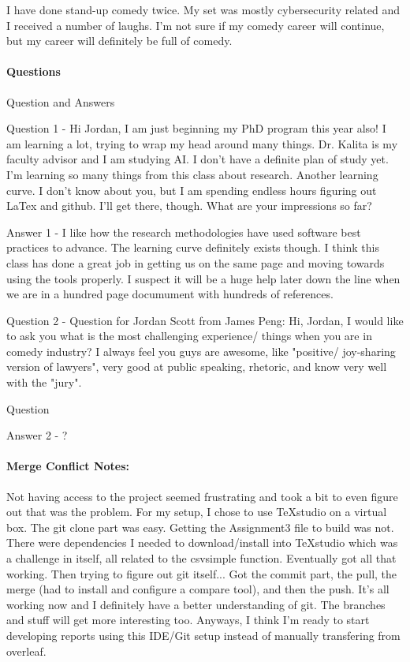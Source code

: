 	I have done stand-up comedy twice. My set was mostly cybersecurity related and I received a number of laughs. I'm not sure if my comedy career will continue, but my career will definitely be full of comedy. 
	

	
	
	
	\paragraph*{\textbf{Questions}}
	
	Question and Answers
	
	
	Question 1 - Hi Jordan, I am just beginning my PhD program this year also!  I am learning a lot, trying to wrap my head around many things.  Dr. Kalita is my faculty advisor and I am studying AI.  I don't have a definite plan of study yet.  I'm learning so many things from this class about research. Another learning curve.  I don't know about you, but I am spending endless hours figuring out LaTex and github. I'll get there, though.  What are your impressions so far?
	
	
	Answer 1 - I like how the research methodologies have used software best practices to advance. The learning curve definitely exists though. I think this class has done a great job in getting us on the same page and moving towards using the tools properly. I suspect it will be a huge help later down the line when we are in a hundred page documument with hundreds of references.

	
	Question 2 - Question for Jordan Scott from James Peng: Hi, Jordan, I would like to ask you what is the most challenging experience/ things when you are  in comedy industry? I always feel you guys are awesome, like "positive/ joy-sharing version of lawyers", very good at public speaking, rhetoric, and know very well with the "jury".
	
	Question
	
	Answer 2 - ?


	\paragraph*{\textbf{Merge Conflict Notes:}}
	
	
	Not having access to the project seemed frustrating and took a bit to even figure out that was the problem. For my setup, I chose to use TeXstudio on a virtual box. The git clone part was easy. Getting the Assignment3 file to build was not. There were dependencies I needed to download/install into TeXstudio which was a challenge in itself, all related to the csvsimple function. Eventually got all that working. Then trying to figure out git itself... Got the commit part, the pull, the merge (had to install and configure a compare tool), and then the push. It's all working now and I definitely have a better understanding of git. The branches and stuff will get more interesting too. Anyways, I think I'm ready to start developing reports using this IDE/Git setup instead of manually transfering from overleaf.
		
	
%

 
